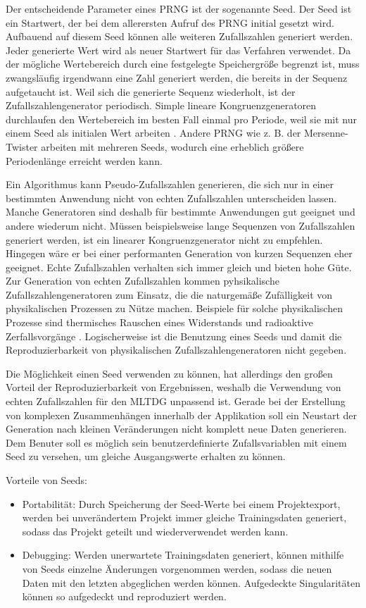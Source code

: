 Der entscheidende Parameter eines \ac{PRNG} ist der sogenannte Seed. Der Seed ist ein Startwert, der bei dem allerersten Aufruf des \ac{PRNG} initial gesetzt wird. Aufbauend auf diesem Seed können alle weiteren Zufallszahlen generiert werden. Jeder generierte Wert wird als neuer Startwert für das Verfahren verwendet. Da der mögliche Wertebereich durch eine festgelegte Speichergröße begrenzt ist, muss zwangsläufig irgendwann eine Zahl generiert werden, die bereits in der Sequenz aufgetaucht ist. Weil sich die generierte Sequenz wiederholt, ist der Zufallszahlengenerator periodisch. Simple lineare Kongruenzgeneratoren durchlaufen den Wertebereich im besten Fall einmal pro Periode, weil sie mit nur einem Seed als initialen Wert arbeiten \cite{prng}. Andere \ac{PRNG} wie z. B. der Mersenne-Twister arbeiten mit mehreren Seeds, wodurch eine erheblich größere Periodenlänge erreicht werden kann.

Ein Algorithmus kann Pseudo-Zufallszahlen generieren, die sich nur in einer bestimmten Anwendung nicht von echten Zufallszahlen unterscheiden lassen. Manche Generatoren sind deshalb für bestimmte Anwendungen gut geeignet und andere wiederum nicht. Müssen beispielsweise lange Sequenzen von Zufallszahlen generiert werden, ist ein linearer Kongruenzgenerator nicht zu empfehlen. Hingegen wäre er bei einer performanten Generation von kurzen Sequenzen eher geeignet. Echte Zufallszahlen verhalten sich immer gleich und bieten hohe Güte. Zur Generation von echten Zufallszahlen kommen pyhsikalische Zufallszahlengeneratoren zum Einsatz, die die naturgemäße Zufälligkeit von physikalischen Prozessen zu Nütze machen. Beispiele für solche physikalischen Prozesse sind thermisches Rauschen eines Widerstands und radioaktive Zerfallsvorgänge \cite{prng}. Logischerweise ist die Benutzung eines Seeds und damit die Reproduzierbarkeit von physikalischen Zufallszahlengeneratoren nicht gegeben.

Die Möglichkeit einen Seed verwenden zu können, hat allerdings den großen Vorteil der Reproduzierbarkeit von Ergebnissen, weshalb die Verwendung von echten Zufallszahlen für den \ac{MLTDG} unpassend ist. Gerade bei der Erstellung von komplexen Zusammenhängen innerhalb der Applikation soll ein Neustart der Generation nach kleinen Veränderungen nicht komplett neue Daten generieren. Dem Benuter soll es möglich sein benutzerdefinierte Zufallsvariablen mit einem Seed zu versehen, um gleiche Ausgangswerte erhalten zu können.

Vorteile von Seeds:
\begin{itemize}
    \item Portabilität: Durch Speicherung der Seed-Werte bei einem Projektexport, werden bei unverändertem Projekt immer gleiche Trainingsdaten generiert, sodass das Projekt geteilt und wiederverwendet werden kann. 
    \item Debugging: Werden unerwartete Trainingsdaten generiert, können mithilfe von Seeds einzelne Änderungen vorgenommen werden, sodass die neuen Daten mit den letzten abgeglichen werden können. Aufgedeckte Singularitäten können so aufgedeckt und reproduziert werden. 
\end{itemize}

